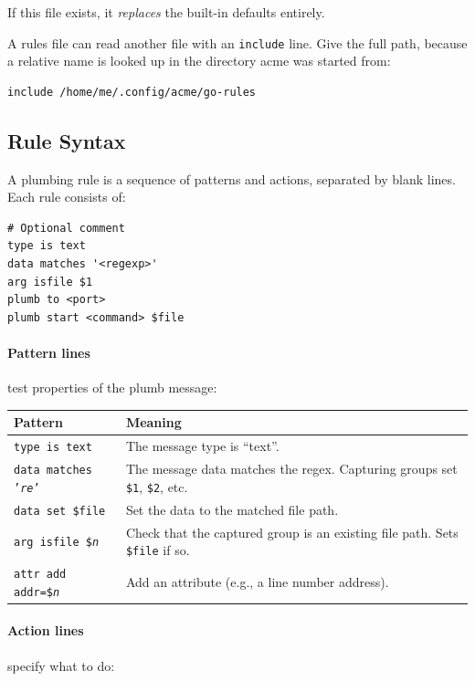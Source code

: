 If this file exists, it \emph{replaces} the built-in defaults entirely.

A rules file can read another file with an \texttt{include} line.  Give
the full path, because a relative name is looked up in the directory
acme was started from:

\begin{lstlisting}[frame=none,basicstyle=\small\ttfamily]
include /home/me/.config/acme/go-rules
\end{lstlisting}

\subsection{Rule Syntax}

A plumbing rule is a sequence of patterns and actions, separated by
blank lines.  Each rule consists of:

\begin{lstlisting}[frame=none,basicstyle=\small\ttfamily]
# Optional comment
type is text
data matches '<regexp>'
arg isfile $1
plumb to <port>
plumb start <command> $file
\end{lstlisting}

\paragraph{Pattern lines} test properties of the plumb message:

\begin{longtable}{@{}lp{3.2in}@{}}
\toprule
Pattern & Meaning \\
\midrule
\endhead
\texttt{type is text} & The message type is ``text''. \\
\texttt{data matches '\textit{re}'} & The message data matches the regex.
  Capturing groups set \texttt{\$1}, \texttt{\$2}, etc. \\
\texttt{data set \$file} & Set the data to the matched file path. \\
\texttt{arg isfile \$\textit{n}} & Check that the captured group is an
  existing file path.  Sets \texttt{\$file} if so. \\
\texttt{attr add addr=\$\textit{n}} & Add an attribute (e.g., a line
  number address). \\
\bottomrule
\end{longtable}

\paragraph{Action lines} specify what to do:

